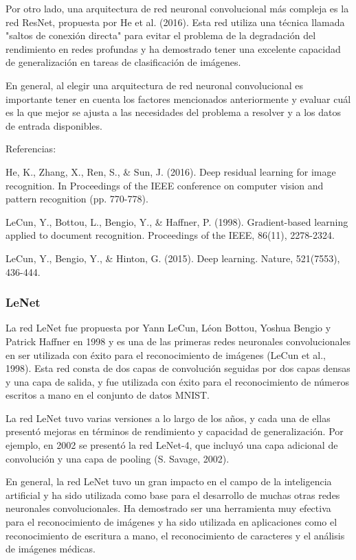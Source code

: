 Por otro lado, una arquitectura de red neuronal convolucional más compleja es la red ResNet, propuesta por He et al.
(2016). Esta red utiliza una técnica llamada "saltos de conexión directa" para evitar el problema de la degradación del
rendimiento en redes profundas y ha demostrado tener una excelente capacidad de generalización en tareas de
clasificación de imágenes.

En general, al elegir una arquitectura de red neuronal convolucional es importante tener en cuenta los factores
mencionados anteriormente y evaluar cuál es la que mejor se ajusta a las necesidades del problema a resolver y a los
datos de entrada disponibles.

Referencias:

He, K., Zhang, X., Ren, S., \& Sun, J. (2016). Deep residual learning for image recognition. In Proceedings of the IEEE
conference on computer vision and pattern recognition (pp. 770-778).

LeCun, Y., Bottou, L., Bengio, Y., \& Haffner, P. (1998). Gradient-based learning applied to document recognition.
Proceedings of the IEEE, 86(11), 2278-2324.

LeCun, Y., Bengio, Y., \& Hinton, G. (2015). Deep learning. Nature, 521(7553), 436-444.

\subsubsection{LeNet}
La red LeNet fue propuesta por Yann LeCun, Léon Bottou, Yoshua Bengio y Patrick Haffner en 1998 y es una de las
primeras redes neuronales convolucionales en ser utilizada con éxito para el reconocimiento de imágenes (LeCun et al.,
1998). Esta red consta de dos capas de convolución seguidas por dos capas densas y una capa de salida, y fue utilizada
con éxito para el reconocimiento de números escritos a mano en el conjunto de datos MNIST.

La red LeNet tuvo varias versiones a lo largo de los años, y cada una de ellas presentó mejoras en términos de
rendimiento y capacidad de generalización. Por ejemplo, en 2002 se presentó la red LeNet-4, que incluyó una capa
adicional de convolución y una capa de pooling (S. Savage, 2002).

En general, la red LeNet tuvo un gran impacto en el campo de la inteligencia artificial y ha sido utilizada como base
para el desarrollo de muchas otras redes neuronales convolucionales. Ha demostrado ser una herramienta muy efectiva
para el reconocimiento de imágenes y ha sido utilizada en aplicaciones como el reconocimiento de escritura a mano, el
reconocimiento de caracteres y el análisis de imágenes médicas.

